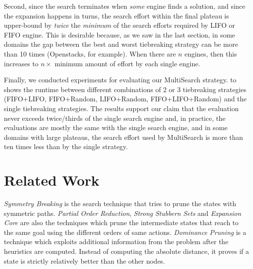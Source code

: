 Second, since the search terminates when \emph{some} engine finds a solution, and since the expansion happens in turns, the search effort within the final plateau is upper-bound by \emph{twice} the \emph{minimum} of the search efforts required by LIFO or FIFO engine. This is desirable because, as we saw in the last section, in some domains the gap between the best and worst tiebreaking strategy can be more than 10 times (Openstacks, for example).
When there are $n$ engines, then this increases to $n\times$ minimum amount of effort by each single engine.

Finally, we conducted experiments for evaluating our MultiSearch strategy.
 to  shows the runtime between different combinations of 2 or 3 tiebreaking strategies (FIFO+LIFO, FIFO+Random, LIFO+Random, FIFO+LIFO+Random) and the single tiebreaking strategies. The results support our claim that the evaluation never exceeds twice/thirds of the single search engine and, in practice, the evaluations are mostly the same with the single search engine, and in some domains with large plateaus, the search effort used by MultiSearch is more than ten times less than by the single strategy.

\begin{figure}[htbp]
 \centering
 \caption{}
 \label{portfolio-ff}
\end{figure}



\section{Related Work}
\label{sec-4}

\emph{Symmetry Breaking} \cite{Fox1998,pochter2011exploiting,domshlak2013symmetry} is the search technique that tries to prune the states with symmetric paths. \emph{Partial Order Reduction}, \emph{Strong Stubbern Sets} and \emph{Expansion Core} are also the techniques which prune the intermediate states that reach to the same goal using the different orders of same actions. \emph{Dominance Pruning} \cite{erol1994} is a technique which exploits additional information from the problem after the heuristics are computed. Instead of computing the absolute distance, it  proves if a state is strictly relatively better than the other nodes.

